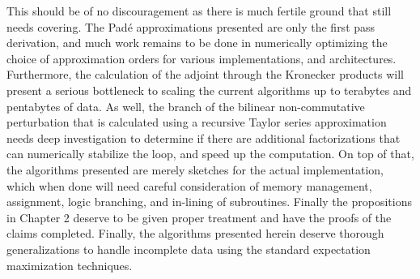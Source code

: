 This should be of no discouragement as there is much fertile ground that still needs
covering. The Pad\'{e} approximations presented are only the first pass derivation, and
much work remains to be done in numerically optimizing the choice of approximation orders
for various implementations, and architectures. Furthermore, the calculation of the adjoint
through the Kronecker products will present a serious bottleneck to scaling the current
algorithms up to terabytes and pentabytes of data. As well, the branch of the bilinear 
non-commutative perturbation that is calculated using a recursive Taylor series 
approximation needs deep investigation to determine if there are additional factorizations 
that can numerically stabilize the loop, and speed up the computation. On top of that, the 
algorithms presented are merely sketches for the actual implementation, which when done will 
need careful consideration of memory management, assignment, logic branching, and in-lining 
of subroutines. Finally the propositions in Chapter 2 deserve to be given proper treatment 
and have the proofs of the claims completed. Finally, the algorithms presented herein 
deserve thorough generalizations to handle incomplete data using the standard expectation 
maximization techniques.